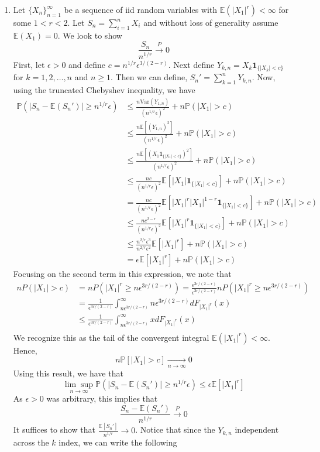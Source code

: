 \documentclass[12pt]{article}  %
\newcommand{\e}{{\epsilon}}
\newcommand{\nsum}{{\sum_{i=1}^n}}
\newcommand{\E}{{\mathbb{E}}}
\newcommand{\V}{{\text{Var}}}
\newcommand{\prob}{{\mathbb{P}}}
\newcommand{\ind}{{\mathbf{1}}}
\begin{document}
\begin{enumerate}
\item Let $\{X_n\}_{n=1}^{\infty}$ be a sequence of iid random variables with $\E(|X_1|^r)<\infty$ for some $1<r<2$. Let $S_n = \nsum X_i$ and without loss of generality assume $\E(X_1) = 0$. We look to show $$\frac{S_n}{n^{1/r}}\overset{P}{\longrightarrow}0$$ First, let $\e>0$ and define $c = n^{1/r}\e^{3/(2-r)}$. Next define $Y_{k,n} = X_k\ind_{\{|X_k|<c\}}$ for $k = 1, 2,\ldots, n$ and $n\geq 1$. Then we can define, $S_n' = \sum_{k = 1}^{n}Y_{k,n}$. Now, using the truncated Chebyshev inequality, we have 
\begin{align*}
\prob(|S_n - \E(S_n')|\geq n^{1/r}\e) & \leq \frac{n\V(Y_{1,n})}{(n^{1/r}\e)^2} + n\prob(|X_1|> c)\\
&\leq \frac{n\E[(Y_{1,n})^2]}{(n^{1/r}\e)^2} + n\prob(|X_1|> c)\\
&\leq \frac{n\E[(X_1\ind_{\{|X_1|<c\}})^2]}{(n^{1/r}\e)^2} + n\prob(|X_1|> c)\\
&\leq \frac{nc}{(n^{1/r}\e)^2}\E[|X_1|\ind_{\{|X_1|<c\}}]+ n\prob(|X_1|> c)\\
&= \frac{nc}{(n^{1/r}\e)^2}\E[|X_1|^r|X_1|^{1-r}\ind_{\{|X_1|<c\}}]+ n\prob(|X_1|> c)\\
&\leq \frac{nc^{2-r}}{(n^{1/r}\e)^2}\E[|X_1|^r\ind_{\{|X_1|<c\}}]+ n\prob(|X_1|> c)\\
&\leq \frac{n^{2/r}\e^{3}}{n^{2/r}\e^2}\E[|X_1|^r]+ n\prob(|X_1|> c)\\
&=\e\E[|X_1|^r] + n\prob(|X_1|>c)
\end{align*}
Focusing on the second term in this expression, we note that 
\begin{align*}
nP(|X_1|>c) &= nP(|X_1|^r\geq n\e^{3r/(2-r)}) = \frac{\e^{3r/(2-r)}}{\e^{3r/(2-r)}}nP(|X_1|^r\geq n\e^{3r/(2-r)})\\
&= \frac{1}{\e^{3r/(2-r)}}\int_{n\e^{3r/(2-r)}}^{\infty}n\e^{3r/(2-r)}dF_{|X_1|^r}(x)\\
&\leq \frac{1}{\e^{3r/(2-r)}}\int_{n\e^{3r/(2-r)}}^{\infty}xdF_{|X_1|^r}(x)\\
\end{align*} 
We recognize this as the tail of the convergent integral $\E(|X_1|^r)<\infty$. Hence, 
$$n\prob[|X_1|> c] \underset{n\to\infty}{\longrightarrow}0$$ Using this result, we have that $$\underset{n\to\infty}{\lim\sup}\prob(|S_n - \E(S_n')|\geq n^{1/r}\e)\leq \e\E[|X_1|^r]$$
As $\e>0$ was arbitrary, this implies that $$\frac{S_n - \E(S_n')}{n^{1/r}}\overset{P}{\longrightarrow} 0$$
It suffices to show that $\frac{\E[S_n']}{n^{1/r}}\longrightarrow 0$. Notice that since the $Y_{k,n}$ independent across the $k$ index, we can write the following 

\end{enumerate}
\end{document}
